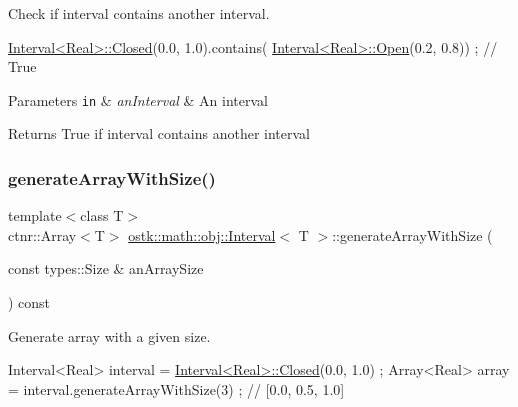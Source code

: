 Check if interval contains another interval. 


\begin{DoxyCode}
\hyperlink{classostk_1_1math_1_1obj_1_1_interval_a48e9f436e8994c49026a1ecd503bc190}{Interval<Real>::Closed}(0.0, 1.0).contains(
      \hyperlink{classostk_1_1math_1_1obj_1_1_interval_ac80686dee5b2893e7b74a5120340db99}{Interval<Real>::Open}(0.2, 0.8)) ; \textcolor{comment}{// True}
\end{DoxyCode}



\begin{DoxyParams}[1]{Parameters}
\mbox{\tt in}  & {\em an\+Interval} & An interval \\
\hline
\end{DoxyParams}
\begin{DoxyReturn}{Returns}
True if interval contains another interval 
\end{DoxyReturn}
\mbox{\label{classostk_1_1math_1_1obj_1_1_interval_afd8ff5687c83009802664ae953928205}} 
\subsubsection{\texorpdfstring{generate\+Array\+With\+Size()}{generateArrayWithSize()}}
{\footnotesize\ttfamily template$<$class T$>$ \\
ctnr\+::\+Array$<$T$>$ \hyperlink{classostk_1_1math_1_1obj_1_1_interval}{ostk\+::math\+::obj\+::\+Interval}$<$ T $>$\+::generate\+Array\+With\+Size (\begin{DoxyParamCaption}\item[{const types\+::\+Size \&}]{an\+Array\+Size }\end{DoxyParamCaption}) const}



Generate array with a given size. 


\begin{DoxyCode}
Interval<Real> interval = \hyperlink{classostk_1_1math_1_1obj_1_1_interval_a48e9f436e8994c49026a1ecd503bc190}{Interval<Real>::Closed}(0.0, 1.0) ;
Array<Real> array = interval.generateArrayWithSize(3) ; \textcolor{comment}{// [0.0, 0.5, 1.0]}
\end{DoxyCode}



